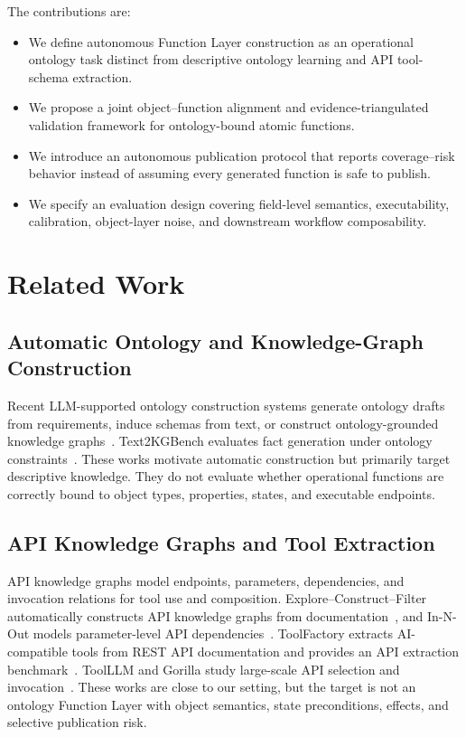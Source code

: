 \documentclass[10pt,twocolumn]{article}
\begin{document}
The contributions are:
\begin{itemize}
    \item We define autonomous Function Layer construction as an operational ontology task distinct from descriptive ontology learning and API tool-schema extraction.
    \item We propose a joint object--function alignment and evidence-triangulated validation framework for ontology-bound atomic functions.
    \item We introduce an autonomous publication protocol that reports coverage--risk behavior instead of assuming every generated function is safe to publish.
    \item We specify an evaluation design covering field-level semantics, executability, calibration, object-layer noise, and downstream workflow composability.
\end{itemize}

\section{Related Work}
\subsection{Automatic Ontology and Knowledge-Graph Construction}
Recent LLM-supported ontology construction systems generate ontology drafts from requirements, induce schemas from text, or construct ontology-grounded knowledge graphs~\cite{kommineni2024human2machine,lippolis2025ontogenia,bai2025autoschemakg,feng2024ontologykg}. Text2KGBench evaluates fact generation under ontology constraints~\cite{mihindukulasooriya2023text2kg}. These works motivate automatic construction but primarily target descriptive knowledge. They do not evaluate whether operational functions are correctly bound to object types, properties, states, and executable endpoints.

\subsection{API Knowledge Graphs and Tool Extraction}
API knowledge graphs model endpoints, parameters, dependencies, and invocation relations for tool use and composition. Explore--Construct--Filter automatically constructs API knowledge graphs from documentation~\cite{sun2025apikg}, and In-N-Out models parameter-level API dependencies~\cite{lee2025innout}. ToolFactory extracts AI-compatible tools from REST API documentation and provides an API extraction benchmark~\cite{ni2025toolfactory}. ToolLLM and Gorilla study large-scale API selection and invocation~\cite{qin2024toolllm,patil2024gorilla}. These works are close to our setting, but the target is not an ontology Function Layer with object semantics, state preconditions, effects, and selective publication risk.
\end{document}
